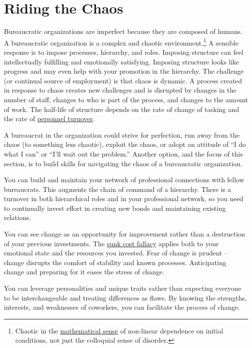 \section{Riding the Chaos\label{sec:process-chaos}}

Bureaucratic organizations are imperfect because they are composed of humans. %
A bureaucratic organization is a complex and chaotic environment.\footnote{Chaotic in the \href{https://en.wikipedia.org/wiki/Chaos_theory}{mathematical sense} 
of non-linear dependence on initial conditions, not just the colloquial sense of disorder.} A sensible response is to impose processes, hierarchy, and roles. Imposing structure can feel intellectually fulfilling and emotionally satisfying. Imposing structure looks like progress and may even help with your promotion in the hierarchy. The challenge (or continual source of employment) is that chaos is dynamic. A process created in response to chaos creates new challenges and is disrupted by changes in the number of staff, changes to who is part of the process, and changes to the amount of work. The half-life of structure depends on the rate of change of tasking and the rate of 
%
\hyperref[sec:turnover]{personnel turnover}.

A bureaucrat in the organization could strive for perfection, run away from the chaos (to something less chaotic), exploit the chaos, or adopt an attitude of ``I do what I can'' or ``I'll wait out the problem.'' 
Another option, and the focus of this section, is to build skills for navigating the chaos of a bureaucratic organization.

You can build and maintain your network of professional connections with fellow bureaucrats. 
%
%
This augments the chain of command of a hierarchy. There is a turnover in both hierarchical roles and in your professional network, so you need to continually invest effort in creating new bonds and maintaining existing relations. 

You can see change as an opportunity for improvement rather than a destruction of your previous investments. The \href{https://en.wikipedia.org/wiki/Sunk_cost}{sunk cost fallacy}
applies both to your emotional state and the resources you invested. Fear of change is prudent -- change disrupts the comfort of stability and known processes. Anticipating change and preparing for it eases the stress of change.

You can leverage personalities and unique traits rather than expecting everyone to be interchangeable and treating differences as flaws. 
By knowing the strengths, interests, and weaknesses of coworkers, you can facilitate the process of change. 